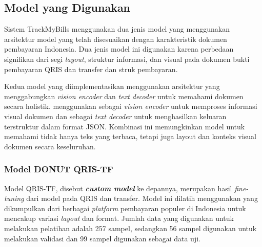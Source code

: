 \subsection{Model yang Digunakan}
\label{subsec:model-yang-digunakan}

Sistem TrackMyBills menggunakan dua jenis model yang menggunakan arsitektur model \donut{} yang telah disesuaikan dengan karakteristik dokumen pembayaran Indonesia. Dua jenis model ini digunakan karena perbedaan signifikan dari segi \emph{layout}, struktur informasi, dan visual pada dokumen bukti pembayaran QRIS dan transfer dan struk pembayaran.

Kedua model yang diimplementasikan menggunakan arsitektur \transformer{} yang menggabungkan \emph{vision encoder} dan \emph{text decoder} untuk memahami dokumen secara holistik. \donut{} menggunakan \swin{} sebagai \emph{vision encoder} untuk memproses informasi visual dokumen dan \bart{} sebagai \emph{text decoder} untuk menghasilkan keluaran terstruktur dalam format JSON. Kombinasi ini memungkinkan model untuk memahami tidak hanya teks yang terbaca, tetapi juga layout dan konteks visual dokumen secara keseluruhan.


\subsubsection{Model DONUT QRIS-TF}
\label{subsubsec:donut-qris-tf}

Model \donut{} QRIS-TF, disebut \textbf{\emph{custom model}} ke depannya, merupakan hasil \emph{fine-tuning} dari model \donutcord{} pada \dataset{} QRIS dan transfer. Model ini dilatih menggunakan \dataset{} yang dikumpulkan dari berbagai \emph{platform} pembayaran populer di Indonesia untuk mencakup variasi \emph{layout} dan format. Jumlah data yang digunakan untuk melakukan pelatihan adalah 257 sampel, sedangkan 56 sampel digunakan untuk melakukan validasi dan 99 sampel digunakan sebagai data uji.

